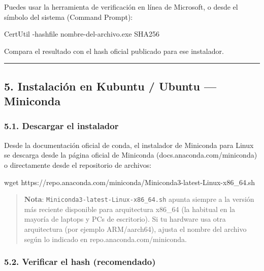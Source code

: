 \documentclass[
  doc,
  floatsintext,
  longtable,
  a4paper,
  nolmodern,
  notxfonts,
  notimes,
  12pt,
  colorlinks=true,linkcolor=blue,citecolor=blue,urlcolor=blue]{apa7}
\newenvironment{Shaded}{\begin{snugshade}}{\end{snugshade}}
\newcommand{\AttributeTok}[1]{\textcolor[rgb]{0.40,0.45,0.13}{#1}}
\newcommand{\FunctionTok}[1]{\textcolor[rgb]{0.28,0.35,0.67}{#1}}
\newcommand{\NormalTok}[1]{\textcolor[rgb]{0.00,0.23,0.31}{#1}}
\begin{document}
Puedes usar la herramienta de verificación en línea de Microsoft, o
desde el símbolo del sistema (Command Prompt):

\begin{Shaded}
\begin{Highlighting}[]
\NormalTok{CertUtil }\AttributeTok{{-}hashfile}\NormalTok{ nombre}\AttributeTok{{-}del{-}archivo}\NormalTok{.exe SHA256}
\end{Highlighting}
\end{Shaded}

Compara el resultado con el hash oficial publicado para ese instalador.

\begin{center}\rule{0.5\linewidth}{0.5pt}\end{center}

\subsection{5. Instalación en Kubuntu / Ubuntu ---
Miniconda}\label{instalaciuxf3n-en-kubuntu-ubuntu-miniconda}

\subsubsection{5.1. Descargar el
instalador}\label{descargar-el-instalador}

Desde la documentación oficial de conda, el instalador de Miniconda para
Linux se descarga desde la página oficial de Miniconda
(docs.anaconda.com/miniconda) o directamente desde el repositorio de
archivos:

\begin{Shaded}
\begin{Highlighting}[]
\FunctionTok{wget}\NormalTok{ https://repo.anaconda.com/miniconda/Miniconda3{-}latest{-}Linux{-}x86\_64.sh}
\end{Highlighting}
\end{Shaded}

\begin{quote}
\textbf{Nota}: \texttt{Miniconda3-latest-Linux-x86\_64.sh} apunta
siempre a la versión más reciente disponible para arquitectura x86\_64
(la habitual en la mayoría de laptops y PCs de escritorio). Si tu
hardware usa otra arquitectura (por ejemplo ARM/aarch64), ajusta el
nombre del archivo según lo indicado en repo.anaconda.com/miniconda.
\end{quote}

\subsubsection{5.2. Verificar el hash
(recomendado)}\label{verificar-el-hash-recomendado}
\end{document}
